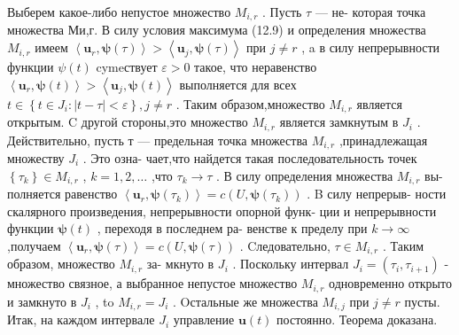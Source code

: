 \documentclass[8pt]{extarticle}
\begin{document}
Выберем какое-либо непустое множество \({M}_{i,r}\) . Пусть \(\tau\) — не- которая точка множества Ми,г. В силу условия максимума (12.9) и определения множества \({M}_{i,r}\) имеем \(\left\langle  {{\mathbf{u}}_{r},\mathbf{\psi }\left( \tau \right) }\right\rangle   > \left\langle  {{\mathbf{u}}_{j},\mathbf{\psi }\left( \tau \right) }\right\rangle\) при \(j \neq  r\) , a в силу непрерывности функции \(\psi \left( t\right)\) cymeствует \(\varepsilon  > 0\) такое, что неравенство \(\left\langle  {{\mathbf{u}}_{r},\mathbf{\psi }\left( t\right) }\right\rangle   > \left\langle  {{\mathbf{u}}_{j},\mathbf{\psi }\left( t\right) }\right\rangle\) выполняется для всех \(t \in  \left\{  {t \in  {J}_{i} : \left| {t - \tau }\right|  < \varepsilon }\right\}  ,j \neq  r\) . Таким образом,множество \({M}_{i,r}\) является открытым. C другой стороны,это множество \({M}_{i,r}\) является замкнутым в \({J}_{i}\) . Действительно, пусть т — предельная точка множества \({M}_{i,r}\) ,принадлежащая множеству \({J}_{i}\) . Это озна- чает,что найдется такая последовательность точек \(\left\{  {\tau }_{k}\right\}   \in  {M}_{i,r}\) , \(k = 1,2,\ldots\) ,что \({\tau }_{k} \rightarrow  \tau\) . В силу определения множества \({M}_{i,r}\) вы- полняется равенство \(\left\langle  {{\mathbf{u}}_{r},\mathbf{\psi }\left( {\tau }_{k}\right) }\right\rangle   = c\left( {U,\mathbf{\psi }\left( {\tau }_{k}\right) }\right)\) . B силу непрерыв- ности скалярного произведения, непрерывности опорной функ- ции и непрерывности функции \(\mathbf{\psi }\left( t\right)\) , переходя в последнем ра- венстве к пределу при \(k \rightarrow  \infty\) ,получаем \(\left\langle  {{\mathbf{u}}_{r},\mathbf{\psi }\left( \tau \right) }\right\rangle   = c\left( {U,\mathbf{\psi }\left( \tau \right) }\right)\) . Cледовательно, \(\tau  \in  {M}_{i,r}\) . Таким образом, множество \({M}_{i,r}\) за- мкнуто в \({J}_{i}\) . Поскольку интервал \({J}_{i} = \left( {{\tau }_{i},{\tau }_{i + 1}}\right)\) - множество связное, а выбранное непустое множество \({M}_{i,r}\) одновременно открыто и замкнуто в \({J}_{i}\) , to \({M}_{i,r} = {J}_{i}\) . Oстальные же множества \({M}_{i,j}\) при \(j \neq  r\) пусты. Итак, на каждом интервале \({J}_{i}\) управление \(\mathbf{u}\left( t\right)\) постоянно. Теорема доказана.
\end{document}
